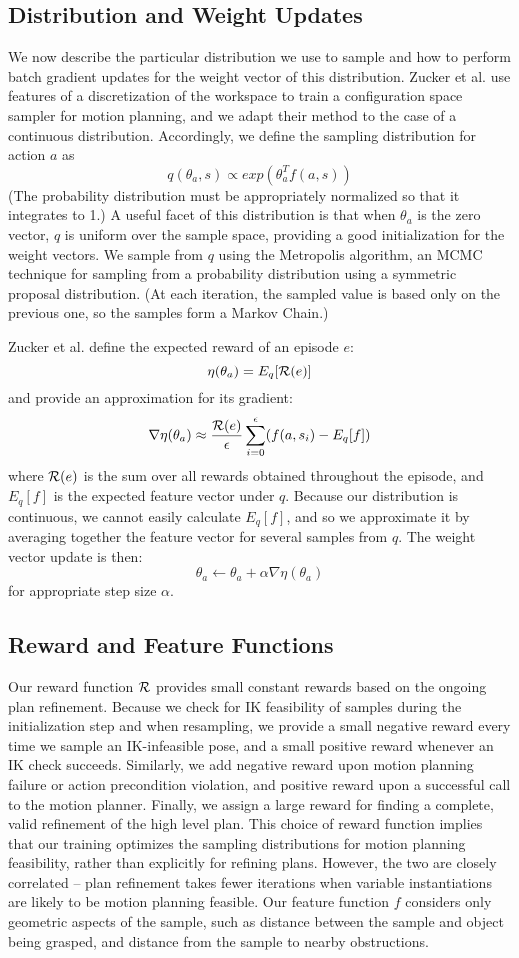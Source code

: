 \subsection{Distribution and Weight Updates}
We now describe the particular distribution we use to sample
and how to perform batch gradient updates for the weight vector of
this distribution. Zucker et al. use features of a discretization of the workspace to train
a configuration space sampler for motion planning, and we adapt their
method to the case of a continuous distribution. Accordingly, we define the sampling distribution for
action $a$ as $$q(\theta_{a}, s) \propto exp(\theta_{a}^{T} f(a, s))$$
(The probability distribution must be appropriately normalized so
that it integrates to 1.) A useful facet of this distribution is
that when $\theta_{a}$ is the zero vector, $q$ is uniform over the
sample space, providing a good initialization for the weight
vectors. We sample from $q$ using the Metropolis algorithm,
an MCMC technique for sampling from a probability distribution using
a symmetric proposal distribution. (At each iteration, the sampled value
is based only on the previous one, so the samples form a Markov Chain.)

Zucker et al. define the expected reward of an episode $e$:
$$\eta(\theta_{a}) = E_{q}[\mathcal{R}(e)]$$ and provide an approximation for its gradient:
$$\nabla \eta(\theta_{a}) \approx \frac{\mathcal{R}(e)}{\epsilon} \sum_{i=0}^{\epsilon}(f(a, s_{i}) - E_{q}[f])$$
where $\mathcal{R}(e)$ is the sum over all rewards obtained throughout the episode, and
$E_{q}[f]$ is the expected feature vector under $q$. Because our distribution
is continuous, we cannot easily calculate $E_{q}[f]$, and so we approximate it by averaging
together the feature vector for several samples from $q$. The weight vector update is then:
$$\theta_{a} \leftarrow \theta_{a} + \alpha \nabla \eta(\theta_{a})$$
for appropriate step size $\alpha$.

\subsection{Reward and Feature Functions}
Our reward function $\mathcal{R}$ provides small constant rewards based on the ongoing
plan refinement. Because we check for IK feasibility of samples during the initialization
step and when resampling, we provide a small negative reward every
time we sample an IK-infeasible pose, and a small positive reward whenever an IK check succeeds.
Similarly, we add negative reward upon motion planning failure or action precondition violation,
and positive reward upon a successful call to the motion planner. Finally, we assign
a large reward for finding a complete, valid refinement of the high level plan.
This choice of reward function implies that our training optimizes the sampling distributions for
motion planning feasibility, rather than explicitly for refining plans. However, the two are
closely correlated -- plan refinement takes fewer iterations when variable
instantiations are likely to be motion planning feasible. Our feature function $f$ considers only geometric
aspects of the sample, such as distance between the sample and object being grasped, and distance from
the sample to nearby obstructions.
